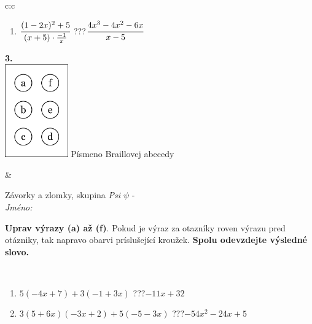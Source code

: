 \documentclass[10pt]{report}
\begin{document}
\begin{tabular}{c:c}
\begin{minipage}[c][104.5mm][t]{0.5\linewidth}
\begin{center}
\begin{minipage}{0.79\linewidth}
\begin{center}
\begin{varwidth}{\linewidth}
\begin{enumerate}
\item $\cfrac{(1-2x)^2+5}{(x+5)\cdot\frac{-1}{x}}$\quad \dotfill\; ???\;\dotfill \quad $\cfrac{4x^3-4x^2-6x}{x-5}$
\end{enumerate}
\end{varwidth}
\end{center}
\end{minipage}
\begin{minipage}{0.20\linewidth}
\begin{center}
{\Huge\bfseries 3.} \\[2mm]
\includegraphics[height=40mm]{../images/braille.png}
{\small Písmeno Braillovej abecedy}
\end{center}
\end{minipage}
\end{center}
\end{minipage}
&
\begin{minipage}[c][104.5mm][t]{0.5\linewidth}
\begin{center}
\vspace{7mm}
{\huge Závorky a zlomky, skupina \textit{Psi $\psi$} -}\\[5mm]
\textit{Jméno:}\phantom{xxxxxxxxxxxxxxxxxxxxxxxxxxxxxxxxxxxxxxxxxxxxxxxxxxxxxxxxxxxxxxxxx}\\[5mm]
\begin{minipage}{0.95\linewidth}
\begin{center}
\textbf{Uprav výrazy (a) až (f)}. Pokud je výraz za otazníky roven výrazu pred otázniky, tak napravo obarvi príslušející kroužek. \textbf{Spolu odevzdejte výsledné slovo.}
\end{center}
\end{minipage}
\\[1mm]
\begin{minipage}{0.79\linewidth}
\begin{center}
\begin{varwidth}{\linewidth}
\begin{enumerate}
\normalsize
\item $5(-4x+7)+3(-1+3x)$\quad \dotfill\; ???\;\dotfill \quad $-11x+32$
\item $3(5+6x)(-3x+2)+5(-5-3x)$\quad \dotfill\; ???\;\dotfill \quad $-54x^2-24x+5$

\end{enumerate}
\end{varwidth}
\end{center}
\end{minipage}
\end{center}
\end{minipage}
\end{tabular}
\end{document}
